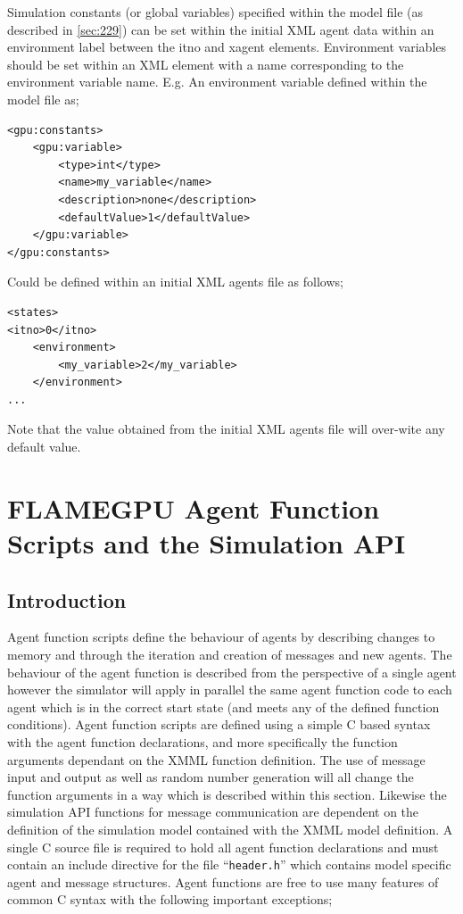 \documentclass[11pt, a4paper, onecolumn, oneside]{report}
\begin{document}
Simulation constants (or global variables) specified within the model file (as described in \cref{sec:229}) can be set within the initial XML agent data within an environment label between the itno and xagent elements. Environment variables should be set within an XML element with a name corresponding to the environment variable name. E.g. An environment variable defined within the model file as;

\begin{verbatim}
<gpu:constants>
    <gpu:variable>
        <type>int</type>
        <name>my_variable</name>
        <description>none</description>
        <defaultValue>1</defaultValue>
    </gpu:variable>
</gpu:constants>
\end{verbatim}

Could be defined within an initial XML agents file as follows;

\begin{verbatim}
<states>
<itno>0</itno>
    <environment>
        <my_variable>2</my_variable>
    </environment>
...
\end{verbatim}

Note that the value obtained from the initial XML agents file will over-wite any default value.

\chapter{FLAMEGPU Agent Function Scripts and the Simulation API}
\label{ch:3}
\section{Introduction}
\label{sec:31}



Agent function scripts define the behaviour of agents by describing changes to memory and through the iteration and creation of messages and new agents.
The behaviour of the agent function is described from the perspective of a single agent however the simulator will apply in parallel the same agent function code to each agent which is in the correct start state (and meets any of the defined function conditions).
Agent function scripts are defined using a simple C based syntax with the agent function declarations, and more specifically the function arguments dependant on the XMML function definition.
The use of message input and output as well as random number generation will all change the function arguments in a way which is described within this section.
Likewise the simulation API functions for message communication are dependent on the definition of the simulation model contained with the XMML model definition.
A single C source file is required to hold all agent function declarations and must contain an include directive for the file ``\texttt{header.h}'' which contains model specific agent and message structures.
Agent functions are free to use many features of common C syntax with the following important exceptions; 
\end{document}
